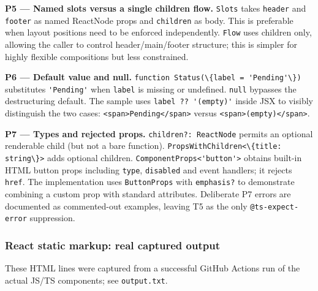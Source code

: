\documentclass[
  10pt,
]{article}
\newcommand{\passthrough}[1]{#1}
\begin{document}
\textbf{P5 --- Named slots versus a single children flow.}
\passthrough{\lstinline!Slots!} takes \passthrough{\lstinline!header!}
and \passthrough{\lstinline!footer!} as named ReactNode props and
\passthrough{\lstinline!children!} as body. This is preferable when
layout positions need to be enforced independently.
\passthrough{\lstinline!Flow!} uses children only, allowing the caller
to control header/main/footer structure; this is simpler for highly
flexible compositions but less constrained.

\textbf{P6 --- Default value and null.}
\passthrough{\lstinline!function Status(\{label = 'Pending'\})!}
substitutes \passthrough{\lstinline!'Pending'!} when
\passthrough{\lstinline!label!} is missing or undefined.
\passthrough{\lstinline!null!} bypasses the destructuring default. The
sample uses \passthrough{\lstinline!label ?? '(empty)'!} inside JSX to
visibly distinguish the two cases:
\passthrough{\lstinline!<span>Pending</span>!} versus
\passthrough{\lstinline!<span>(empty)</span>!}.

\textbf{P7 --- Types and rejected props.}
\passthrough{\lstinline!children?: ReactNode!} permits an optional
renderable child (but not a bare function).
\passthrough{\lstinline!PropsWithChildren<\{title: string\}>!} adds
optional children. \passthrough{\lstinline!ComponentProps<'button'>!}
obtains built-in HTML button props including
\passthrough{\lstinline!type!}, \passthrough{\lstinline!disabled!} and
event handlers; it rejects \passthrough{\lstinline!href!}. The
implementation uses \passthrough{\lstinline!ButtonProps!} with
\passthrough{\lstinline!emphasis?!} to demonstrate combining a custom
prop with standard attributes. Deliberate P7 errors are documented as
commented-out examples, leaving T5 as the only
\passthrough{\lstinline!@ts-expect-error!} suppression.

\subsubsection{React static markup: real captured
output}\label{react-static-markup-real-captured-output}

These HTML lines were captured from a successful GitHub Actions run of
the actual JS/TS components; see \passthrough{\lstinline!output.txt!}.
\end{document}
